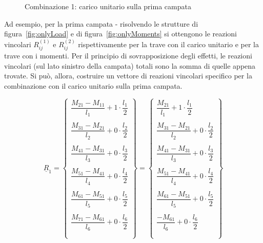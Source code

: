 \begin{figure}
{\label{fig:onlyMoments}}
    \caption{Combinazione 1: carico unitario sulla prima campata}
    \label{fig:comboLoadSpan_1}
\end{figure}

Ad esempio, per la prima campata - risolvendo le strutture di figura~\ref{fig:onlyLoad} e di figura~\ref{fig:onlyMoments} si ottengono le reazioni vincolari $R_{ij}^{(1)}$ e $R_{ij}^{(2)}$ rispettivamente per la trave con il carico unitario e per la trave con i momenti. Per il principio di sovrapposizione degli effetti, le reazioni vincolari (sul lato sinistro della campata) totali sono la somma di quelle appena trovate. Si può, allora, costruire un vettore di reazioni vincolari specifico per la combinazione con il carico unitario sulla prima campata.

\begin{equation*}
 \underline{R}_1 = \begin{Bmatrix}
    \dfrac{M_{21} - M_{11}}{l_1} + 1\cdot\dfrac{l_1}{2}\\\\
    \dfrac{M_{31} - M_{21}}{l_2} + 0\cdot\dfrac{l_2}{2}\\\\
    \dfrac{M_{41} - M_{31}}{l_3} + 0\cdot\dfrac{l_3}{2}\\\\
    \dfrac{M_{51} - M_{41}}{l_4} + 0\cdot\dfrac{l_4}{2}\\\\
    \dfrac{M_{61} - M_{51}}{l_5} + 0\cdot\dfrac{l_5}{2}\\\\
    \dfrac{M_{71} - M_{61}}{l_6} + 0\cdot\dfrac{l_6}{2}\\\\
 \end{Bmatrix} = 
 \begin{Bmatrix}
    \dfrac{M_{21}}{l_1} + 1\cdot\dfrac{l_1}{2}\\\\
    \dfrac{M_{31} - M_{21}}{l_2} + 0\cdot\dfrac{l_2}{2}\\\\
    \dfrac{M_{41} - M_{31}}{l_3} + 0\cdot\dfrac{l_3}{2}\\\\
    \dfrac{M_{51} - M_{41}}{l_4} + 0\cdot\dfrac{l_4}{2}\\\\
    \dfrac{M_{61} - M_{51}}{l_5} + 0\cdot\dfrac{l_5}{2}\\\\
    \dfrac{- M_{61}}{l_6} + 0\cdot\dfrac{l_6}{2}\\\\
 \end{Bmatrix}
\end{equation*}

